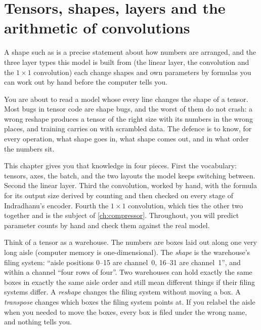 \chapter{Tensors, shapes, layers and the arithmetic of convolutions}\label{ch:shapes}

\begin{onething}
A shape such as  is a precise statement about how numbers are arranged, and the
three layer types this model is built from (the linear layer, the convolution and the $1\times1$
convolution) each change shapes and own parameters by formulas you can work out by hand before the
computer tells you.
\end{onething}

You are about to read a model whose every line changes the shape of a tensor. Most bugs in tensor code
are shape bugs, and the worst of them do not crash: a wrong reshape produces a tensor of the right size
with its numbers in the wrong places, and training carries on with scrambled data. The defence is to
know, for every operation, what shape goes in, what shape comes out, and in what order the numbers sit.

This chapter gives you that knowledge in four pieces. First the vocabulary: tensors, axes, the batch,
and the two layouts the model keeps switching between. Second the linear layer. Third the
convolution, worked by hand, with the formula for its output size derived by counting and then checked
on every stage of Indradhanu's encoder. Fourth the $1\times1$ convolution, which ties the other two
together and is the subject of \cref{ch:compressor}. Throughout, you will predict parameter counts by
hand and check them against the real model.

\begin{analogy}
Think of a tensor as a warehouse. The numbers are boxes laid out along one very long aisle (computer
memory is one-dimensional). The \emph{shape} is the warehouse's filing system: ``aisle positions
0--15 are channel~0, 16--31 are channel~1'', and within a channel ``four rows of four''. Two
warehouses can hold exactly the same boxes in exactly the same aisle order and still mean different
things if their filing systems differ. A \emph{reshape} changes the filing system without moving a box.
A \emph{transpose} changes which boxes the filing system points at. If you relabel the aisle when you
needed to move the boxes, every box is filed under the wrong name, and nothing tells you.
\end{analogy}


